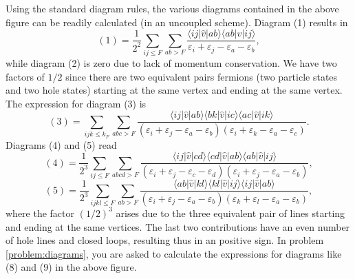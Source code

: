   Using the standard diagram rules, the various
  diagrams contained in the above figure can be readily calculated (in
  an uncoupled scheme). Diagram  (1) results in
  \begin{equation}
     (1)=\frac{1}{2^2}\sum_{ij\leq F}\sum_{ab>F}
    \frac{\langle ij\vert\hat{v}\vert ab\rangle \langle
      ab\vert\hat{v}\vert ij\rangle}
         {\varepsilon_i+\varepsilon_j-\varepsilon_a-\varepsilon_b},
  \end{equation}
 while diagram (2) is zero due to lack of momentum conservation. We have two factors of $1/2$ since there are two equivalent pairs fermions (two  particle states and two hole states) starting at the same vertex and ending at the same vertex. The expression for diagram (3)  is 
  \begin{equation}
     (3)=\sum_{ijk\leq k_F}\sum_{abc > F}
    \frac{\langle ij\vert\hat{v}\vert ab\rangle \langle
      bk\vert\hat{v}\vert ic\rangle \langle ac\vert\hat{v}\vert
      ik\rangle}
         {(\varepsilon_i+\varepsilon_j-\varepsilon_a-\varepsilon_b)
           (\varepsilon_i+\varepsilon_k-\varepsilon_a-\varepsilon_c)}.
  \end{equation}
  Diagrams (4) and (5) read
  \begin{equation}
     (4)=\frac{1}{2^3}\sum_{ij\le F}\sum_{abcd > F}
    \frac{\langle ij\vert\hat{v}\vert cd\rangle \langle
      cd\vert\hat{v}\vert ab\rangle \langle ab\vert\hat{v}\vert
      ij\rangle}
         {(\varepsilon_i+\varepsilon_j-\varepsilon_c-\varepsilon_d)
           (\varepsilon_i+\varepsilon_j-\varepsilon_a-\varepsilon_b)},
  \end{equation}
  \begin{equation}
     (5)=\frac{1}{2^3}\sum_{ijkl\le F}\sum_{ab > F}
    \frac{\langle ab\vert\hat{v}\vert kl\rangle \langle
      kl\vert\hat{v}\vert ij\rangle \langle ij\vert\hat{v}\vert
      ab\rangle}
         {(\varepsilon_i+\varepsilon_j-\varepsilon_a-\varepsilon_b)
           (\varepsilon_k+\varepsilon_l-\varepsilon_a-\varepsilon_b)},
  \end{equation}
where the factor $(1/2)^3$ arises due to the three equivalent pair of lines starting and ending at the same vertices. The last two contributions 
have an even number of hole lines and closed loops, resulting thus in an positive sign. In problem \ref{problem:diagrams}, you are asked to calculate the expressions for diagrams like (8) and (9) in the above figure. 

